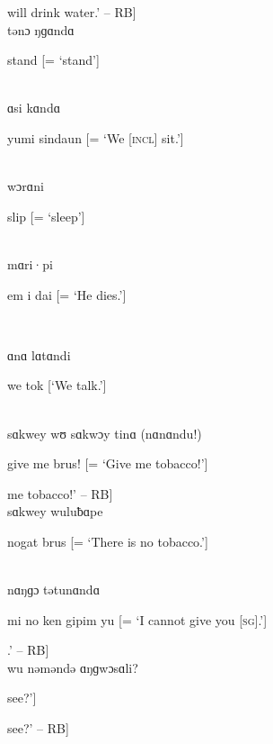 \noindent [‘[I] will drink water.’ -- RB]\\

\noindent tənɔ ŋɡɑndɑ

\noindent stand [= ‘stand’]

\\

\noindent ɑsi kɑndɑ

\noindent yumi sindaun [= ‘We [\textsc{incl}] sit.’]

\\

\noindent wɔrɑni

\noindent slip [= ‘sleep’]

\\

\noindent mɑri·pi

\noindent em i dai [= ‘He dies.’]

\noindent [‘He died.’ -- RB]\\

\newpage

\noindent ɑnɑ lɑtɑndi

\noindent we tok [‘We talk.’]

\\

\noindent sɑkwey wʊ sɑkwɔy tinɑ (nɑnɑndu!)

\noindent give me brus! [= ‘Give me tobacco!’]

\noindent [‘Tobacco – [give] [\textsc{sg}] me tobacco!’ -- RB]\\

\noindent sɑkwey wuluƀɑpe

\noindent nogat brus [= ‘There is no tobacco.’]

\\

\noindent nɑŋɡɔ tətunɑndɑ

\noindent mi no ken gipim yu [= ‘I cannot give you [\textsc{sg}].’]

\noindent [‘I cannot give you [\textsc{sg}].’ -- RB]\\

\noindent wu nəməndə ɑŋɡwɔsɑli?

\noindent [‘What do you [\textsc{sg}] see?’]

\noindent [‘What do you [\textsc{sg}] see?’ -- RB]\\

